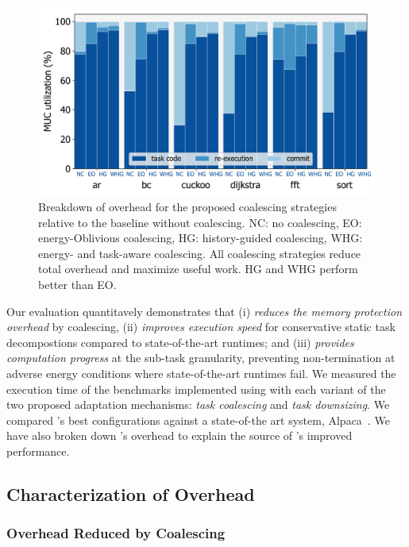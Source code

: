 \begin{figure}
	\centering
	\includegraphics[width=0.5\columnwidth]{figures/coalEfficiency}
    \caption{Breakdown of overhead for the proposed coalescing strategies
relative to the baseline without coalescing.
NC: no coalescing, EO: energy-Oblivious coalescing, HG: history-guided coalescing, WHG:
energy- and task-aware coalescing. All coalescing strategies reduce total
overhead and maximize useful work. HG and WHG perform better than EO.}
	\label{fig:overallOverheadBreakdown}
\end{figure}

Our evaluation quantitavely demonstrates that \sys (i) \emph{reduces the memory
protection overhead} by coalescing, (ii) \emph{improves execution speed} for
conservative static task decompostions compared to state-of-the-art runtimes; %
and (iii) \emph{provides computation progress} at the sub-task granularity,
preventing non-termination at adverse energy conditions where state-of-the-art
runtimes fail. We measured the execution time of the benchmarks implemented
using \sys with each variant of the two proposed adaptation mechanisms:
\emph{task coalescing} and \emph{task downsizing}. We compared \sys's best
configurations against a state-of-the art system, Alpaca~\cite{alpaca}. We have
also broken down \sys's overhead to explain the source of \sys's improved
performance.

\subsection{Characterization of Overhead}
\label{sec:coala_overhead}


\subsubsection{Overhead Reduced by Coalescing}
\label{sec:overhead-coalescing}


